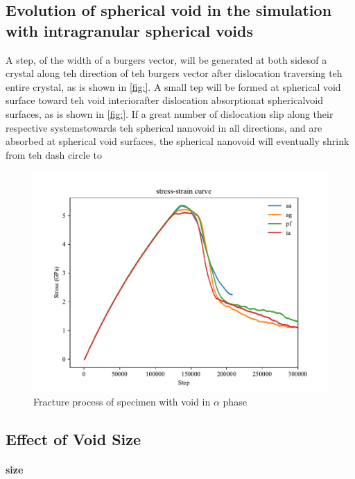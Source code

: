 \documentclass[times]{elsarticle}
\begin{document}

\subsection{Evolution of spherical void in the simulation with intragranular spherical voids}
A step, of the width of a burgers vector, will be generated at both sidesof a crystal along teh direction of teh burgers vector after dislocation traversing teh entire crystal, as is shown in \ref{fig:}. A small tep will be formed at spherical void surface toward teh void interiorafter dislocation absorptionat sphericalvoid surfaces, as is shown in \ref{fig:}. If a great number of dislocation slip along their respective systemstowards teh spherical nanovoid in all directions, and are absorbed at spherical void surfaces, the spherical nanovoid will eventually shrink from teh dash circle to




\begin{figure}[h]
	\centering
	\includegraphics[width=0.7\linewidth]{img/allline}
	\caption{Fracture process of specimen with void in $\alpha$ phase}
	\label{ }
\end{figure}




\subsection{Effect of Void Size}
\paragraph{size}
 
\end{document}
